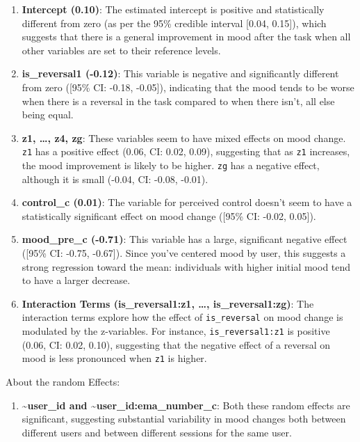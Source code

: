 \documentclass[
  man]{apa6}
\providecommand{\tightlist}{%
  \setlength{\itemsep}{0pt}\setlength{\parskip}{0pt}}
\begin{document}
\begin{enumerate}
\def\labelenumi{\arabic{enumi}.}
\tightlist
\item
  \textbf{Intercept (0.10)}: The estimated intercept is positive and statistically different from zero (as per the 95\% credible interval {[}0.04, 0.15{]}), which suggests that there is a general improvement in mood after the task when all other variables are set to their reference levels.
\item
  \textbf{is\_reversal1 (-0.12)}: This variable is negative and significantly different from zero ({[}95\% CI: -0.18, -0.05{]}), indicating that the mood tends to be worse when there is a reversal in the task compared to when there isn't, all else being equal.
\item
  \textbf{z1, \ldots, z4, zg}: These variables seem to have mixed effects on mood change. \texttt{z1} has a positive effect (0.06, CI: 0.02, 0.09), suggesting that as \texttt{z1} increases, the mood improvement is likely to be higher. \texttt{zg} has a negative effect, although it is small (-0.04, CI: -0.08, -0.01).
\item
  \textbf{control\_c (0.01)}: The variable for perceived control doesn't seem to have a statistically significant effect on mood change ({[}95\% CI: -0.02, 0.05{]}).
\item
  \textbf{mood\_pre\_c (-0.71)}: This variable has a large, significant negative effect ({[}95\% CI: -0.75, -0.67{]}). Since you've centered mood by user, this suggests a strong regression toward the mean: individuals with higher initial mood tend to have a larger decrease.
\item
  \textbf{Interaction Terms (is\_reversal1:z1, \ldots, is\_reversal1:zg)}: The interaction terms explore how the effect of \texttt{is\_reversal} on mood change is modulated by the z-variables. For instance, \texttt{is\_reversal1:z1} is positive (0.06, CI: 0.02, 0.10), suggesting that the negative effect of a reversal on mood is less pronounced when \texttt{z1} is higher.
\end{enumerate}

About the random Effects:

\begin{enumerate}
\def\labelenumi{\arabic{enumi}.}
\tightlist
\item
  \textbf{\textasciitilde user\_id and \textasciitilde user\_id:ema\_number\_c}: Both these random effects are significant, suggesting substantial variability in mood changes both between different users and between different sessions for the same user.
\end{enumerate}
\end{document}
